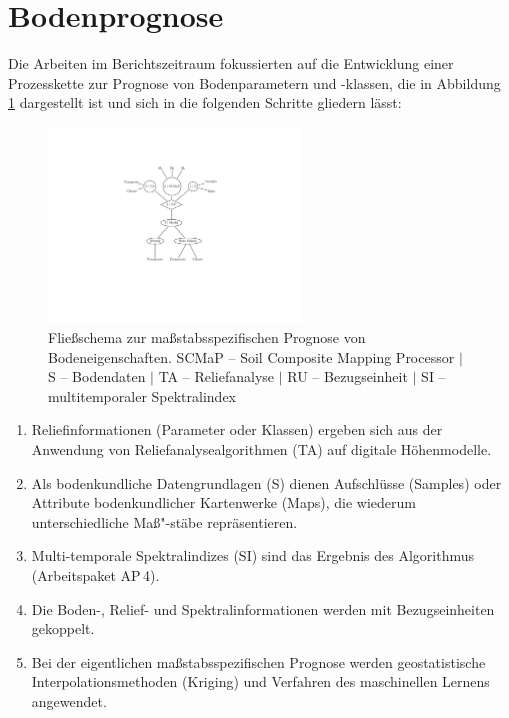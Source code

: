 \maketitle


\tableofcontents
\newpage

\section{Bodenprognose}
Die Arbeiten im Berichtszeitraum fokussierten auf die  Entwicklung einer Prozesskette zur Prognose von Bodenparametern und -klassen, die in Abbildung \ref{fig:scheme} dargestellt ist und sich in die folgenden Schritte gliedern lässt:

\begin{figure}[t]
    \centering
    \centering\includegraphics[width=0.6\textwidth]{figures/SOIL_DE_scheme.pdf}
    \caption{Fließschema zur maßstabsspezifischen Prognose von Bodeneigenschaften. SCMaP --  Soil Composite Mapping Processor $|$ S -- Bodendaten $|$ TA -- Reliefanalyse $|$ RU -- Bezugseinheit $|$ SI -- multitemporaler Spektralindex}
    \label{fig:scheme}
\end{figure}

\begin{enumerate}
     \item Reliefinformationen (Parameter oder Klassen) ergeben sich aus der Anwendung von Reliefanalysealgorithmen (TA) auf digitale Höhenmodelle.
      \item Als bodenkundliche Datengrundlagen (S) dienen Aufschlüsse (Samples) oder Attribute bodenkundlicher Kartenwerke (Maps), die wiederum unterschiedliche Maß"-stäbe repräsentieren.
     \item Multi-temporale Spektralindizes (SI) sind das Ergebnis des Algorithmus  (Arbeitspaket AP\,4).
     \item Die Boden-, Relief- und Spektralinformationen werden mit Bezugseinheiten gekoppelt. 
     \item Bei der eigentlichen maßstabsspezifischen Prognose werden  geostatistische Interpolationsmethoden (Kriging)  und Verfahren des maschinellen Lernens angewendet.
 \end{enumerate}

